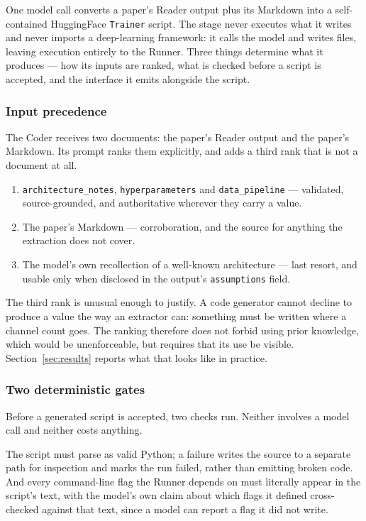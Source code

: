 \documentclass[10pt,twocolumn]{article}
\begin{document}
One model call converts a paper's Reader output plus its Markdown into a self-contained
HuggingFace \texttt{Trainer} script. The stage never executes what it writes and never
imports a deep-learning framework: it calls the model and writes files, leaving execution
entirely to the Runner. Three things determine what it produces --- how its inputs are
ranked, what is checked before a script is accepted, and the interface it emits alongside
the script.


\subsubsection{Input precedence}

The Coder receives two documents: the paper's Reader output and the paper's Markdown. Its
prompt ranks them explicitly, and adds a third rank that is not a document at all.

\begin{enumerate}
  \item \texttt{architecture\_notes}, \texttt{hyperparameters} and \texttt{data\_pipeline}
        --- validated, source-grounded, and authoritative wherever they carry a value.
  \item The paper's Markdown --- corroboration, and the source for anything the extraction
        does not cover.
  \item The model's own recollection of a well-known architecture --- last resort, and
        usable only when disclosed in the output's \texttt{assumptions} field.
\end{enumerate}

The third rank is unusual enough to justify. A code generator cannot decline to produce a
value the way an extractor can: something must be written where a channel count goes. The
ranking therefore does not forbid using prior knowledge, which would be unenforceable, but
requires that its use be visible. Section~\ref{sec:results} reports what that looks like
in practice.

\subsubsection{Two deterministic gates}

Before a generated script is accepted, two checks run. Neither involves a model call and
neither costs anything.

The script must parse as valid Python; a failure writes the source to a separate path for
inspection and marks the run failed, rather than emitting broken code. And every
command-line flag the Runner depends on must literally appear in the script's text, with
the model's own claim about which flags it defined cross-checked against that text, since
a model can report a flag it did not write.
\end{document}
